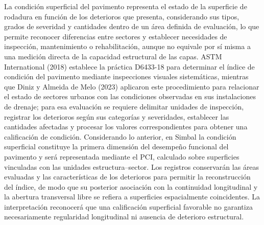 La condición superficial del pavimento representa el estado de la superficie de rodadura en función de los deterioros que presenta, considerando sus tipos, grados de severidad y cantidades dentro de un área definida de evaluación, lo que permite reconocer diferencias entre sectores y establecer necesidades de inspección, mantenimiento o rehabilitación, aunque no equivale por sí misma a una medición directa de la capacidad estructural de las capas. ASTM International (2018) establece la práctica D6433-18 para determinar el índice de condición del pavimento mediante inspecciones visuales sistemáticas, mientras que Diniz y Almeida de Melo (2023) aplicaron este procedimiento para relacionar el estado de sectores urbanos con las condiciones observadas en sus instalaciones de drenaje; para esa evaluación se requiere delimitar unidades de inspección, registrar los deterioros según sus categorías y severidades, establecer las cantidades afectadas y procesar los valores correspondientes para obtener una calificación de condición. Considerando lo anterior, en Simbal la condición superficial constituye la primera dimensión del desempeño funcional del pavimento y será representada mediante el PCI, calculado sobre superficies vinculadas con las unidades estructura–sector. Los registros conservarán las áreas evaluadas y las características de los deterioros para permitir la reconstrucción del índice, de modo que su posterior asociación con la continuidad longitudinal y la abertura transversal libre se refiera a superficies espacialmente coincidentes. La interpretación reconocerá que una calificación superficial favorable no garantiza necesariamente regularidad longitudinal ni ausencia de deterioro estructural.


